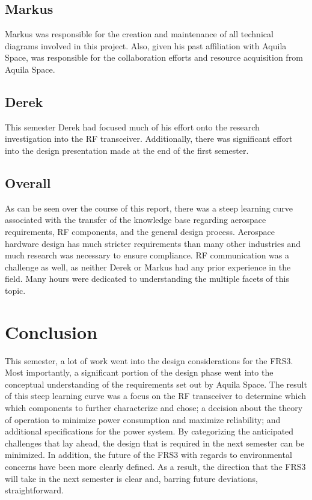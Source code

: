 \documentclass[12pt, twoside]{report}
\begin{document}
\section{Markus}
Markus was responsible for the creation and maintenance of all technical diagrams involved in this project. Also, given his past affiliation with Aquila Space, was responsible for the collaboration efforts and resource acquisition from Aquila Space.
\section{Derek}
This semester Derek had focused much of his effort onto the research investigation into the RF transceiver. Additionally, there was significant effort into the design presentation made at the end of the first semester.

\section{Overall}
As can be seen over the course of this report, there was a steep learning curve associated with the transfer of the knowledge base regarding aerospace requirements, RF components, and the general design process. Aerospace hardware design has much stricter requirements than many other industries and much research was necessary to ensure compliance. RF communication was a challenge as well, as neither Derek or Markus had any prior experience in the field. Many hours were dedicated to understanding the multiple facets of this topic.

\chapter{Conclusion}
This semester, a lot of work went into the design considerations for the FRS3.
Most importantly, a significant portion of the design phase went into the conceptual understanding of the requirements set out by Aquila Space.
The result of this steep learning curve was a focus on the RF transceiver to determine which which components to further characterize and chose; a decision about the theory of operation to minimize power consumption and maximize reliability; and additional specifications for the power system.
By categorizing the anticipated challenges that lay ahead, the design that is required in the next semester can be minimized.
In addition, the future of the FRS3 with regards to environmental concerns have been more clearly defined.
As a result, the direction that the FRS3 will take in the next semester is clear and, barring future deviations, straightforward.
\end{document}
